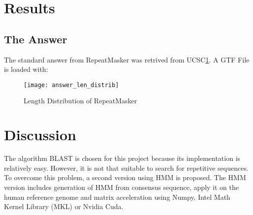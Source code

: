 \documentclass[10pt,final,journal,twocolumn,a4paper]{IEEEtran}
\begin{document}
\section{Results}

\subsection{The Answer}

The standard answer from RepeatMasker was retrived from UCSC\ref{fig:answerlendistrib}. A GTF File is loaded with:

\begin{figure}
    \centering
    \texttt{[image: answer\_len\_distrib]}
    \caption{Length Distribution of RepeatMasker}
    \label{fig:answerlendistrib}
\end{figure}




\section{Discussion}

The algorithm BLAST is chosen for this project because its implementation is relatively easy. However, it is not that suitable to search for repetitive sequences. To overcome this problem, a second version using HMM is proposed. The HMM version includes generation of HMM from consensus sequence, apply it on the human reference genome and matrix acceleration using Numpy, Intel Math Kernel Library (MKL) or Nvidia Cuda.
\end{document}
